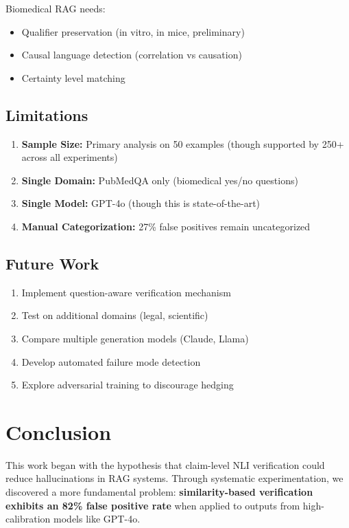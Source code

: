 \documentclass[11pt]{article}
\begin{document}
Biomedical RAG needs:
\begin{itemize}
\item Qualifier preservation (in vitro, in mice, preliminary)
\item Causal language detection (correlation vs causation)
\item Certainty level matching
\end{itemize}

\subsection{Limitations}

\begin{enumerate}
\item \textbf{Sample Size:} Primary analysis on 50 examples (though supported by 250+ across all experiments)
\item \textbf{Single Domain:} PubMedQA only (biomedical yes/no questions)
\item \textbf{Single Model:} GPT-4o (though this is state-of-the-art)
\item \textbf{Manual Categorization:} 27\% false positives remain uncategorized
\end{enumerate}

\subsection{Future Work}

\begin{enumerate}
\item Implement question-aware verification mechanism
\item Test on additional domains (legal, scientific)
\item Compare multiple generation models (Claude, Llama)
\item Develop automated failure mode detection
\item Explore adversarial training to discourage hedging
\end{enumerate}

\section{Conclusion}

This work began with the hypothesis that claim-level NLI verification could reduce hallucinations in RAG systems. Through systematic experimentation, we discovered a more fundamental problem: \textbf{similarity-based verification exhibits an 82\% false positive rate} when applied to outputs from high-calibration models like GPT-4o.
\end{document}
